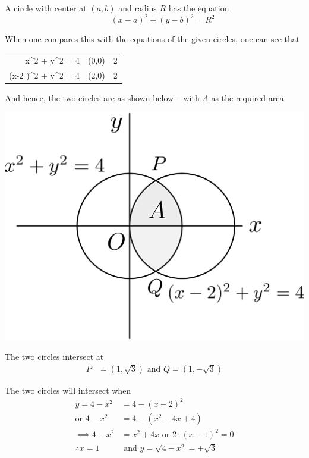 \documentclass[14pt,fleqn]{extarticle}
\newcommand\yone{4-x^2}
\newcommand\ytwo{4- \left(x-2 \right)^2}
\begin{document}
\newcard

A circle with center at $(a,b)$ and radius $R$ has the equation 
\[ \qquad \left(x-a \right)^2 + \left(y-b \right)^2 = R^2 \]

When one compares this with the equations of the given circles, one can see that 
\begin{center}
  \begin{tabular}{NNN}
   \toprule
         &  &   \\
   \midrule 
   x^2 + y^2 = 4 & (0,0) & 2 \\
    \midrule 
    \left(x-2 \right)^2 + y^2 = 4 & (2,0) & 2 \\
    \bottomrule
  \end{tabular}
\end{center}
And hence, the two circles are as shown below -- with $A$ as the required area 

\begin{center}
\includegraphics[scale=0.35]{figure.svg} 
\end{center} 

\newcard

The two circles intersect at 
\begin{align}
P &= \left(1,\sqrt{3} \right)\text{ and } Q = \left(1, -\sqrt{3} \right)
\end{align}

\newcard 

The two circles will intersect when 
\begin{align}
	y = \yone &= \ytwo \\
	\text{or } 4-x^2 &= 4 - \left(x^2- 4x + 4 \right) \\
	\implies \yone &= x^2 + 4x \text{ or } 2\cdot \left(x-1 \right)^2 = 0 \\
	\therefore x = 1&\text{ and } y = \sqrt{\yone} = \pm \sqrt{3} 
\end{align}
\end{document}
